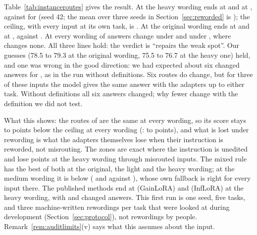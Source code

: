 Table~\ref{tab:instanceroutes} gives the result. At the heavy wording \recog{} ends at
\AudUHeavyRidgeAP{} and \handicap{} at \AudUHeavyHandicapAP{}, against \AudUHeavyCertAP{} for
\cert{} (seed 42; the mean over three seeds in Section~\ref{sec:reworded} is \FiveCertAPHeavy{});
the ceiling, with every input at its own task, is \AudUHeavyOwnAP{}. At the original
wording \recog{} ends at \AudUOriginalRidgeAP{} and \handicap{} at \AudUOriginalHandicapAP{},
against \AudUOriginalCertAP{}. At every wording \AudUOriginalRidgeChanged{} of \AudUCompared{}
answers change under \recog{} and \AudUOriginalHandicapChanged{} under \handicap{}, where \cert{}
changes none. All three lines hold: the verdict is ``repairs the weak spot''.
Our guesses (78.5 to 79.3 at the original wording, 75.5 to 76.7 at the heavy one) held, and one
was wrong in the good direction: we had expected about six changed answers for \recog{}, as in
the run without definitions. Six routes do change, but for three
of these inputs the model gives the same answer with the adapters up to either task. Without
definitions all six answers changed; why fewer change with the definition we did not test.

What this shows: the routes of \recog{} are the same at every wording, so its score stays
\AudURidgeBelowOwnLow{} to \AudURidgeBelowOwnHigh{} points below the ceiling at every wording
(\handicap{}: \AudUHandicapBelowOwnLow{} to \AudUHandicapBelowOwnHigh{} points), and what is lost
under rewording is what the adapters themselves lose when their instruction is reworded, not
misrouting. The zones are exact where the instruction is unedited and lose
\AudUHeavyCertBelowOwn{} points at the heavy wording through misrouted
inputs. The mixed rule has the best of both at the original, the light and the heavy wording; at
the medium wording it is below \cert{} (\AudUMediumMixRidgeAP{} and \AudUMediumMixHandicapAP{}
against \AudUMediumCertAP{}), whose own fallback is right for every input there. The published
methods end at \AudWordHeavyGainloraAP{} (GainLoRA) and \AudWordHeavyInfloraAP{} (InfLoRA) at the
heavy wording, with \AudWordHeavyGainloraChanged{} and \AudWordHeavyInfloraChanged{} changed
answers. This first run is one seed, five tasks, and three machine-written rewordings per task
that were looked at during development (Section~\ref{sec:protocol}), not
rewordings by people. Remark~\ref{rem:auditlimits}(v) says what this assumes about
the input.

